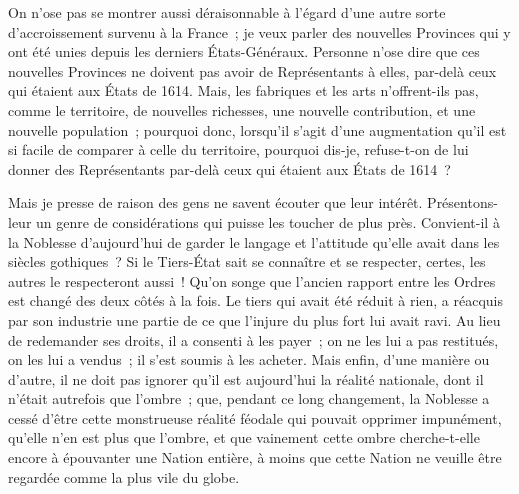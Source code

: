 \documentclass[french,twoside]{book} %
\begin{document}
On n’ose pas se montrer aussi déraisonnable à l’égard d’une autre sorte d’accroissement survenu à la France ; je veux parler des nouvelles Provinces qui y ont été unies depuis les derniers États-Généraux. Personne n’ose dire que ces nouvelles Provinces ne doivent pas avoir de Représentants à elles, par-delà ceux qui étaient aux États de 1614. Mais, les fabriques et les arts n’offrent-ils pas, comme le territoire, de nouvelles richesses, une nouvelle contribution, et une nouvelle population ; pourquoi donc, lorsqu’il s’agit d’une augmentation qu’il est si facile de comparer à celle du territoire, pourquoi dis-je, refuse-t-on de lui donner des Représentants par-delà ceux qui étaient aux États de 1614 ?\par
Mais je presse de raison des gens ne savent écouter que leur intérêt. Présentons-leur un genre de considérations qui puisse les toucher de plus près. Convient-il à la Noblesse d’aujourd’hui de garder le langage et l’attitude qu’elle avait dans les siècles gothiques ? Si le Tiers-État sait se connaître et se respecter, certes, les autres le respecteront aussi ! Qu’on songe que l’ancien rapport entre les Ordres est changé des deux côtés à la fois. Le tiers qui avait été réduit à rien, a réacquis par son industrie une partie de ce que l’injure du plus fort lui avait ravi. Au lieu de redemander ses droits, il a consenti à les payer ; on ne les lui a pas restitués, on les lui a vendus ; il s’est soumis à les acheter. Mais enfin, d’une manière ou d’autre, il ne doit pas ignorer qu’il est aujourd’hui la réalité nationale, dont il n’était autrefois que l’ombre ; que, pendant ce long changement, la Noblesse a cessé d’être cette monstrueuse réalité féodale qui pouvait opprimer impunément, qu’elle n’en est plus que l’ombre, et que vainement cette ombre cherche-t-elle encore à épouvanter une Nation entière, à moins que cette Nation ne veuille être regardée comme la plus vile du globe.\par
\end{document}
